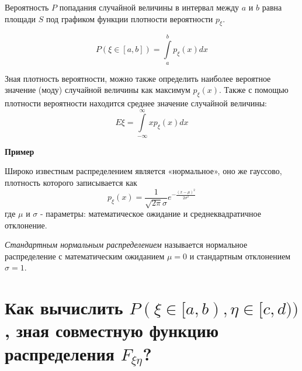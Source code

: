 Вероятность $P$ попадания случайной величины в интервал между $a$ и $b$ равна площади $S$ под графиком функции плотности вероятности $p_{\xi}$.
\begin{figure}[H]
\end{figure}
\[ P(\xi \in [a,b]) = \int\limits_{a}^{b} p_{\xi} (x) dx \]

Зная плотность вероятности, можно также определить наиболее вероятное значение (моду) случайной величины как максимум $p_{\xi}(x)$. Также с помощью плотности вероятности находится среднее значение случайной величины:
\[ E\xi = \int\limits_{-\infty}^{\infty} x p_{\xi} (x) dx \]

\noindent \textbf{Пример}

Широко известным распределением является «нормальное», оно же гауссово, плотность которого записывается как
\[ p_{\xi} (x) = \frac{1}{\sqrt{2 \pi} \sigma} e^{- \frac{(x - \mu)^2}{2 \sigma^2}} \]
где $\mu$ и $\sigma$ - параметры: математическое ожидание и среднеквадратичное отклонение.

\textit{Стандартным нормальным распределением} называется нормальное распределение с математическим ожиданием $\mu = 0$ и стандартным отклонением $\sigma = 1$.

\section{Как вычислить $P(\xi \in [a, b), \eta \in [c, d))$, зная совместную функцию распределения $F_{\xi\eta}$?}

